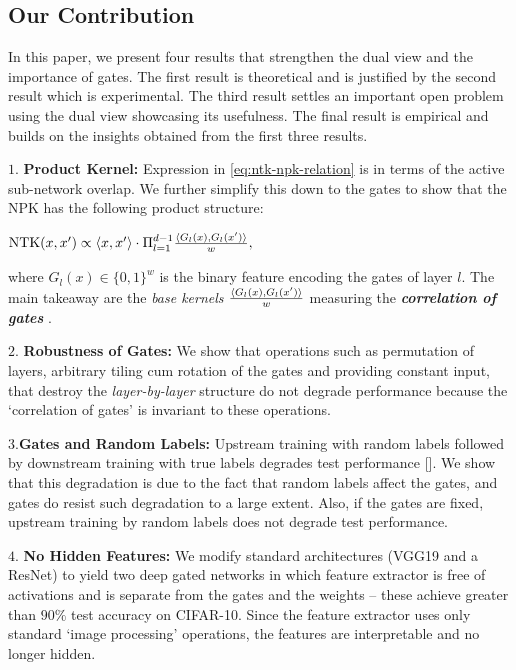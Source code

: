 \subsection{Our Contribution}
In this paper, we present four results that strengthen the dual view and the importance of gates.  The first result is theoretical and is justified by the second result which is experimental. The third result settles an important open problem using the dual view showcasing its usefulness. The final result is empirical and builds on the insights obtained from the first three results. 

\indent\quad$1.$ \textbf{Product Kernel:} Expression in \eqref{eq:ntk-npk-relation} is in terms of the active sub-network overlap. We further simplify this down to the gates to show that the NPK has the following product structure:
\centerline{$\text{NTK}(x,x') \propto \langle x,x'\rangle\cdot \Pi_{l=1}^{d-1} \frac{\langle G_l(x),G_l(x')\rangle}w,$}

where $G_l(x)\in\{0,1\}^w$ is the binary feature encoding the gates of layer $l$. The main takeaway are the \emph{base kernels} $\frac{\langle G_l(x),G_l(x')\rangle}w$ measuring the \textbf{\emph{correlation of gates} }.

\indent\quad$2.$ \textbf{Robustness of Gates:} We show that operations such as permutation of layers, arbitrary tiling cum rotation of the gates and providing constant input, that destroy the \emph{layer-by-layer} structure do not degrade performance because the `correlation of gates' is invariant to these operations.

\indent\quad$3.$\textbf{Gates and Random Labels:} Upstream training with random labels followed by downstream training with true labels degrades test performance []. We show that this degradation is due to the fact that random labels affect the gates, and gates do resist such degradation to a large extent. Also, if the gates are fixed, upstream training by random labels does not degrade test performance.

\indent\quad$4.$ \textbf{No Hidden Features:} We modify standard architectures (VGG19 and a ResNet) to yield two deep gated networks in which feature extractor is free of activations and is separate from the gates and the weights -- these achieve greater than $90\%$ test accuracy on CIFAR-10. Since the feature extractor uses only standard `image processing' operations, the features are interpretable and no longer hidden.


